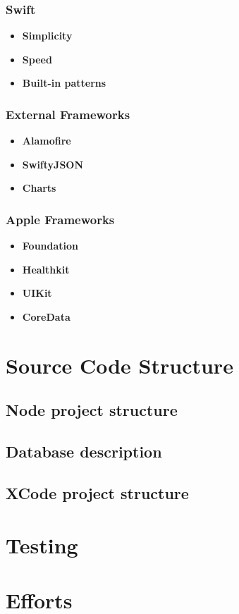 \documentclass[titlepage]{article}
\begin{document}
\subsubsection{\bf Swift}
\begin{itemize}
	\item {\bf Simplicity}
	\item {\bf Speed}
	\item {\bf Built-in patterns}
\end{itemize}
\subsubsection{\bf External Frameworks}
\begin{itemize}
	\item {\bf Alamofire}
	\item {\bf SwiftyJSON}
	\item {\bf Charts}
\end{itemize}
\subsubsection{\bf Apple Frameworks}
\begin{itemize}
	\item {\bf Foundation}
	\item {\bf Healthkit}
	\item {\bf UIKit}
	\item {\bf CoreData}
\end{itemize}

\pagebreak
\section{Source Code Structure}
\subsection{Node project structure}
\subsection{Database description}
\subsection{XCode project structure}

\pagebreak
\section{Testing}

\pagebreak
\section{Efforts}
\end{document}
